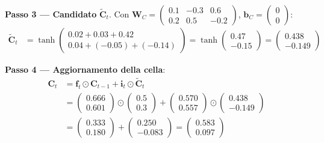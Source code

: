 \documentclass[12pt,a4paper]{article}
\begin{document}
\begin{examplebox}
\textbf{Passo 3 --- Candidato} $\tilde{\mathbf{C}}_t$.
Con $\mathbf{W}_C = \begin{pmatrix} 0.1 & -0.3 & 0.6 \\ 0.2 & 0.5 & -0.2 \end{pmatrix}$, $\mathbf{b}_C = \begin{pmatrix} 0 \\ 0 \end{pmatrix}$:
\begin{align*}
    \tilde{\mathbf{C}}_t &= \tanh\!\begin{pmatrix} 0.02 + 0.03 + 0.42 \\ 0.04 + (-0.05) + (-0.14) \end{pmatrix} = \tanh\!\begin{pmatrix} 0.47 \\ -0.15 \end{pmatrix} = \begin{pmatrix} 0.438 \\ -0.149 \end{pmatrix}
\end{align*}

\textbf{Passo 4 --- Aggiornamento della cella}:
\begin{align*}
    \mathbf{C}_t &= \mathbf{f}_t \odot \mathbf{C}_{t-1} + \mathbf{i}_t \odot \tilde{\mathbf{C}}_t \\
    &= \begin{pmatrix} 0.666 \\ 0.601 \end{pmatrix} \odot \begin{pmatrix} 0.5 \\ 0.3 \end{pmatrix} + \begin{pmatrix} 0.570 \\ 0.557 \end{pmatrix} \odot \begin{pmatrix} 0.438 \\ -0.149 \end{pmatrix} \\
    &= \begin{pmatrix} 0.333 \\ 0.180 \end{pmatrix} + \begin{pmatrix} 0.250 \\ -0.083 \end{pmatrix} = \begin{pmatrix} 0.583 \\ 0.097 \end{pmatrix}
\end{align*}


\end{examplebox}
\end{document}
